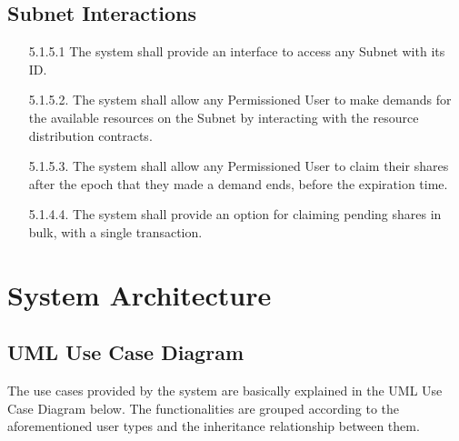 \documentclass[a4paper,12pt]{report}
\begin{document}
\subsection{Subnet Interactions}
\begin{itemize}
	\item [5.1.5.1]
	The system shall provide an interface to access any Subnet with its ID.
	\\
	\item [5.1.5.2.]
	The system shall allow any Permissioned User to make demands for the available resources on the Subnet by interacting with the resource distribution contracts.
	\\
	\item [5.1.5.3.]
	The system shall allow any Permissioned User to claim their shares after the epoch that they made a demand ends, before the expiration time.
	\\
	\item [5.1.4.4.]
	The system shall provide an option for claiming pending shares in bulk, with a single transaction.
\end{itemize}

\section{System Architecture}

\subsection{UML Use Case Diagram}
The use cases provided by the system are basically explained in the UML Use Case Diagram below. The functionalities are grouped according to the aforementioned user types and the inheritance relationship between them.
\end{document}
